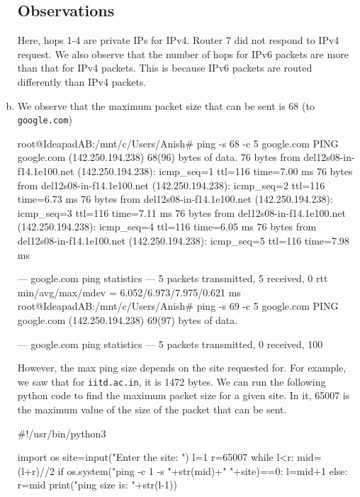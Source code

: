 \begin{enumerate}[a.]
    \subsection*{Observations}
    Here, hops 1-4 are private IPs for IPv4. Router 7 did not respond to IPv4 request. We also observe that the number of hops for IPv6 packets are more than that for IPv4 packets. This is because IPv6 packets are routed differently than IPv4 packets.

    \item We observe that the maximum packet size that can be sent is 68 (to {\tt google.com})
\begin{code}
root@IdeapadAB:/mnt/c/Users/Anish# ping -s 68 -c 5 google.com
PING google.com (142.250.194.238) 68(96) bytes of data.
76 bytes from del12s08-in-f14.1e100.net (142.250.194.238): icmp_seq=1 ttl=116 time=7.00 ms
76 bytes from del12s08-in-f14.1e100.net (142.250.194.238): icmp_seq=2 ttl=116 time=6.73 ms
76 bytes from del12s08-in-f14.1e100.net (142.250.194.238): icmp_seq=3 ttl=116 time=7.11 ms
76 bytes from del12s08-in-f14.1e100.net (142.250.194.238): icmp_seq=4 ttl=116 time=6.05 ms
76 bytes from del12s08-in-f14.1e100.net (142.250.194.238): icmp_seq=5 ttl=116 time=7.98 ms

--- google.com ping statistics ---
5 packets transmitted, 5 received, 0%
rtt min/avg/max/mdev = 6.052/6.973/7.975/0.621 ms
root@IdeapadAB:/mnt/c/Users/Anish# ping -s 69 -c 5 google.com
PING google.com (142.250.194.238) 69(97) bytes of data.

--- google.com ping statistics ---
5 packets transmitted, 0 received, 100%
\end{code}
However, the max ping size depends on the site requested for. For example, we saw that for {\tt iitd.ac.in}, it is 1472 bytes.
We can run the following python code to find the maximum packet size for a given site. In it, 65007 is the maximum value of the size of the packet that can be sent.
\begin{code}
    #!/usr/bin/python3

    import os
    site=input("Enter the site: ")
    l=1
    r=65007
    while l<r:
        mid=(l+r)//2
        if os.system("ping -c 1 -s "+str(mid)+" "+site)==0:
            l=mid+1
        else:
            r=mid
    print("\n\nMax ping size is: "+str(l-1))
\end{code}
\end{enumerate}
